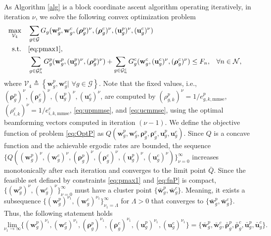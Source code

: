 \documentclass[12pt,draftcls,onecolumn]{IEEEtran}
\theoremstyle{remark}
\theoremstyle{definition}
\begin{document}
{\indent As Algorithm \ref{alg} is a block coordinate ascent algorithm operating iteratively, in iteration $\nu$, we solve the following convex optimization problem
\begin{subequations}\label{eq:OptPnu}
	\begin{align}
		\underset{\mathcal{V}_4}{\text{max}}\quad &\sum_{g\in\mathcal{G}} G_g(\mathbf{w}_{g}^p, \mathbf{w}_{g}^c, ({\bm \rho}_g^p)^\nu,({\bm \rho}_g^c)^\nu,(\mathbf{u}_g^p)^\nu,(\mathbf{u}_g^c)^\nu)  \\
		\text{s.t.} \quad & \eqref{eq:pmax1}, \nonumber \\
		& \sum_{{g \in \mathcal{G}_n^p}}G_g^p(\mathbf{w}_g^p,(\mathbf{u}_g^p)^\nu,({\bm \rho}_g^p)^\nu)  + \sum_{{g \in \mathcal{G}_n^c}}G_g^c(\mathbf{w}_g^c,(\mathbf{u}_g^c)^\nu,({\bm \rho}_g^c)^\nu) \leq F_{n}, &&\forall n \in \mathcal{N}, \label{eq:fnP}
	\end{align}
\end{subequations}  
where $\mathcal{V}_4 \triangleq \left\lbrace \mathbf{w}_{g}^p, \mathbf{w}_{g}^c|\,\, \forall g \in \mathcal{G}\right\rbrace$.
Note that the fixed values, i.e., $({\bm \rho}_g^p)^\nu,({\bm \rho}_g^c)^\nu,(\mathbf{u}_g^p)^\nu,(\mathbf{u}_g^c)^\nu$, are computed by $(\rho_{g,k}^p)^\nu = 1/e_{g,k,\text{mmse}}^p$, $(\rho_{i,k}^c)^\nu = 1/e_{i,k,\text{mmse}}^c$, \eqref{eq:upmmse}, and \eqref{eq:ucmmse}, using the optimal beamforming vectors computed in iteration $(\nu-1)$. We define the objective function of problem \eqref{eq:OptP} as $Q(\mathbf{w}_{g}^p, \mathbf{w}_{g}^c, {\bm \rho}_g^p,{\bm \rho}_g^c,\mathbf{u}_g^p,\mathbf{u}_g^c)$. Since $Q$ is a concave function and the achievable ergodic rates are bounded, the sequence $\{Q((\mathbf{w}_{g}^p)^\nu, (\mathbf{w}_{g}^c)^\nu, ({\bm \rho}_g^p)^\nu,({\bm \rho}_g^c)^\nu,(\mathbf{u}_g^p)^\nu,(\mathbf{u}_g^c)^\nu)\}_{\nu=0}^{\infty}$ increases monotonically after each iteration and converges to the limit point $\bar{Q}$. Since the feasible set defined by constraints \eqref{eq:pmax1} and \eqref{eq:fnP} is compact, $\{(\mathbf{w}_{g}^p)^\nu, (\mathbf{w}_{g}^c)^\nu\}_{\nu=0}^{\infty}$ must have a cluster point $\{\bar{\mathbf{w}}_{g}^p, \bar{\mathbf{w}}_{g}^c\}$. Meaning, it exists a subsequence $\{(\mathbf{w}_{g}^p)^{\nu_1}, (\mathbf{w}_{g}^c)^{\nu_1}\}_{\nu_1=\Lambda}^{\infty}$ for $\Lambda>0$ that converges to $\{\bar{\mathbf{w}}_{g}^p, \bar{\mathbf{w}}_{g}^c\}$. Thus, the following statement holds
\begin{equation}
	\underset{\nu_1\rightarrow\infty}{\text{lim}} \{ (\mathbf{w}_{g}^p)^{\nu_1}, (\mathbf{w}_{g}^c)^{\nu_1}, ({\bm \rho}_g^p)^{\nu_1},({\bm \rho}_g^c)^{\nu_1},(\mathbf{u}_g^p)^{\nu_1},(\mathbf{u}_g^c)^{\nu_1} \} = \{ \bar{\mathbf{w}}_{g}^p, \bar{\mathbf{w}}_{g}^c, \bar{\bm \rho}_g^p, \bar{\bm \rho}_g^c , \bar{\mathbf{u}}_g^p , \bar{\mathbf{u}}_g^c  \}.

\end{equation}}
\end{document}
